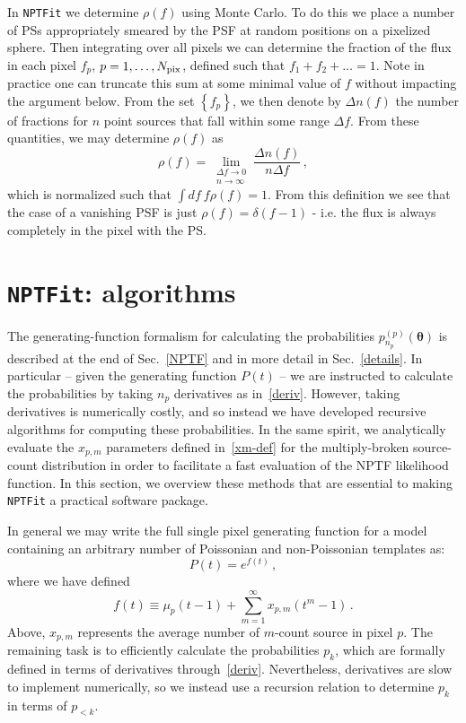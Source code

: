 In \texttt{NPTFit} we determine $\rho(f)$ using Monte Carlo. To do this we place a number of PSs appropriately smeared by the PSF at random positions on a pixelized sphere. Then integrating over all pixels we can determine the fraction of the flux in each pixel $f_p$, $p=1,\ldots, N_{\rm pix}$, defined such that $f_1+f_2+\ldots = 1$. Note in practice one can truncate this sum at some minimal value of $f$ without impacting the argument below. From the set $\left\{f_p \right\}$, we then denote by $\Delta n(f)$ the number of fractions for $n$ point sources that fall within some range $\Delta f$. From these quantities, we may determine $\rho(f)$ as
\begin{equation}
\rho(f) = \lim_{\substack{\Delta f \to 0 \\ n \to \infty}} \frac{\Delta n(f)}{n \Delta f}\,,
\end{equation}
which is normalized such that $\int df~f \rho(f) = 1$. From this definition we see that the case of a vanishing PSF is just $\rho(f) = \delta(f-1)$ - i.e. the flux is always completely in the pixel with the PS.

\section{\texttt{NPTFit}: algorithms}
\label{algorithms}

The generating-function formalism for calculating the probabilities $p_{n_p}^{(p)}({\bm \theta})$ is described at the end of Sec.~\ref{NPTF} and in more detail in Sec.~\ref{details}.  In particular -- given the generating function $P(t)$ -- we are instructed to calculate the probabilities by taking $n_p$ derivatives as in~\eqref{deriv}.  However, taking derivatives is numerically costly, and so instead we have developed recursive algorithms for computing these probabilities.  In the same spirit, we analytically evaluate the $x_{p,m}$ parameters defined in~\eqref{xm-def} for the multiply-broken source-count distribution in order to facilitate a fast evaluation of the NPTF likelihood function.  In this section, we overview these methods that are essential to making \texttt{NPTFit} a practical software package.   

In general we may write the full single pixel generating function for a model containing an arbitrary number of Poissonian and non-Poissonian templates as:
\begin{equation}
P(t) = e^{f(t)}\,,
\end{equation}
where we have defined
\begin{equation}
f(t) \equiv \mu_p(t-1) + \sum_{m=1}^{\infty} x_{p,m} (t^m - 1)\,.
\end{equation}
Above, $x_{p,m} $ represents the average number of $m$-count source in pixel $p$. The remaining task is to efficiently calculate the probabilities $p_k$, which are formally defined in terms of derivatives through~\eqref{deriv}. Nevertheless, derivatives are slow to implement numerically, so we instead use a recursion relation to determine $p_k$ in terms of $p_{< k}$.

